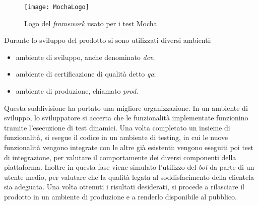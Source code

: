 \begin{figure}[H]
  \centering
  \texttt{[image: MochaLogo]}
  \caption{Logo del \textit{framework} usato per i test Mocha}
\end{figure}

Durante lo sviluppo del prodotto si sono utilizzati diversi ambienti:
\begin{itemize}
  \item ambiente di sviluppo, anche denominato \textit{dev};
  \item ambiente di certificazione di qualità detto \textit{qa};
  \item ambiente di produzione, chiamato \textit{prod}.
\end{itemize}
Questa suddivisione ha portato una migliore organizzazione. In un ambiente di
sviluppo, lo sviluppatore si accerta che le funzionalità implementate
funzionino tramite l'esecuzione di test dinamici.
Una volta completato un insieme di funzionalità, si esegue il codice in un
ambiente di testing, in cui le nuove funzionalità vengono integrate con le
altre già esistenti: vengono eseguiti poi test di integrazione, per
valutare il comportamente dei diversi componenti della piattaforma. Inoltre
in questa fase viene simulato l'utilizzo del \textit{bot} da parte di un
utente medio, per valutare che la qualità legata al soddisfacimento della
clientela sia adeguata.
Una volta ottenuti i risultati desiderati, si procede a rilasciare il
prodotto in un ambiente di produzione e a renderlo disponibile al pubblico.
